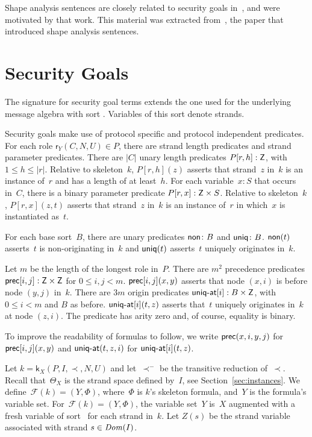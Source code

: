 \documentclass[12pt]{report}
\theoremstyle{definition}
\newcommand{\sdom}{\fn{Dom}}
\newcommand{\role}{\mathsf{r}}
\newcommand{\skel}{\mathsf{k}}
\newcommand{\form}{\mathcal{F}}
\begin{document}
Shape analysis sentences are closely related to security goals
in~\cite{guttman09}, and were motivated by that work.  This material
was extracted from~\cite{ramsdell12}, the paper that introduced shape
analysis sentences.

\section{Security Goals}\label{sec:security goals}

The signature for security goal terms extends the one used for the
underlying message algebra with sort .  Variables of this sort
denote strands.

Security goals make use of protocol specific and protocol independent
predicates.  For each role $\role_Y(C,N,U)\in P$, there are strand length
predicates and strand parameter predicates.  There are $|C|$ unary
length predicates $P[r,h]:\mathsf{Z}$, with $1\leq h\leq|r|$.  Relative
to skeleton~$k$, $P[r,h](z)$ asserts that strand~$z$ in~$k$ is an
instance of~$r$ and has a length of at least~$h$.  For each
variable~$x:S$ that occurs in~$C$, there is a binary parameter
predicate $P[r,x]:\mathsf{Z}\times{}S$.  Relative to skeleton~$k$,
$P[r,x](z,t)$ asserts that strand~$z$ in~$k$ is an instance of~$r$ in
which~$x$ is instantiated as~$t$.

For each base sort~$B$, there are unary predicates $\operatorname{\mathsf{non}}\colon B$
and $\operatorname{\mathsf{uniq}}\colon B$.  $\operatorname{\mathsf{non}}(t)$ asserts~$t$ is non-originating
in~$k$ and $\operatorname{\mathsf{uniq}}(t)$ asserts~$t$ uniquely originates in~$k$.

Let $m$ be the length of the longest role in~$P$.  There are $m^2$
precedence predicates $\operatorname{\mathsf{prec}}[i,j]:\mathsf{Z}\times\mathsf{Z}$ for $0\leq
i,j< m$.  $\operatorname{\mathsf{prec}}[i,j](x,y)$ asserts that node $(x,i)$ is before
node $(y,j)$ in~$k$.  There are $3m$ origin predicates
$\operatorname{\mathsf{uniq-at}}[i]:B\times\mathsf{Z}$, with $0\leq i< m$ and $B$ as before.
$\operatorname{\mathsf{uniq-at}}[i](t,z)$ asserts that~$t$ uniquely originates in~$k$ at
node $(z,i)$.  The predicate  has arity zero and, of course,
equality is binary.

To improve the readability of formulas to follow, we write
$\operatorname{\mathsf{prec}}(x,i,y,j)$ for $\operatorname{\mathsf{prec}}[i,j](x,y)$ and $\operatorname{\mathsf{uniq-at}}(t,z,i)$
for $\operatorname{\mathsf{uniq-at}}[i](t,z)$.

Let $k=\skel_X(P,I,\prec,N,U)$ and let~$\prec^-$ be the transitive
reduction of~$\prec$.  Recall that~$\Theta_X$ is the strand space
defined by~$I$, see Section~\ref{sec:instances}.  We
define~$\form(k)=(Y,\Phi)$, where~$\Phi$ is $k$'s skeleton formula,
and~$Y$ is the formula's variable set.  For~$\form(k)=(Y,\Phi)$, the
variable set~$Y$ is~$X$ augmented with a fresh variable of
sort~ for each strand in~$k$.  Let $Z(s)$ be the strand
variable associated with strand $s\in\sdom(I)$.
\end{document}
